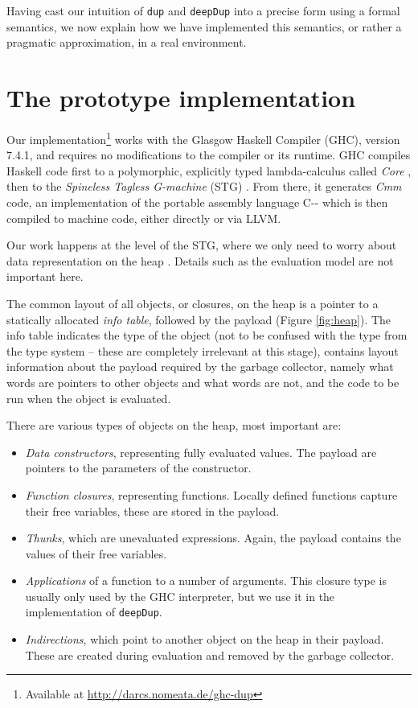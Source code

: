 \documentclass[preprint]{sigplanconf}
\theoremstyle{nonumberplain}
\newcommand{\li}{\lstinline[style=Haskell]}
\begin{document}
Having cast our intuition of \li-dup- and \li-deepDup- into a precise form using a formal semantics, we now explain how we have implemented this semantics, or rather a pragmatic approximation, in a real environment.

\section{The prototype implementation}
\label{sec:prototype}

Our implementation\footnote{Available at \url{http://darcs.nomeata.de/ghc-dup}} works with the Glasgow Haskell Compiler (GHC), version 7.4.1, and requires no modifications to the compiler or its runtime. GHC compiles Haskell code first to a polymorphic, explicitly typed lambda-calculus called \emph{Core} \citep{core,system-fc}, then to the \emph{Spineless Tagless G-machine} (STG) \citep{stg}. From there, it generates \emph{Cmm} code, an implementation of the portable assembly language C-{}- which is then compiled to machine code, either directly or via LLVM.

Our work happens at the level of the STG, where we only need to worry about data representation on the heap \citep{stg}. Details such as the evaluation model \cite{evalapply} are not important here.

The common layout of all objects, or closures,  on the heap is a pointer to a statically allocated \emph{info table}, followed by the payload (Figure \ref{fig:heap}). The info table indicates the type of the object (not to be confused with the type from the type system – these are completely irrelevant at this stage), contains layout information about the payload required by the garbage collector, namely what words are pointers to other objects and what words are not, and the code to be run when the object is evaluated.

There are various types of objects on the heap, most important are:
\begin{itemize}
\item \emph{Data constructors}, representing fully evaluated values. The payload are pointers to the parameters of the constructor.
\item \emph{Function closures}, representing functions. Locally defined functions capture their free variables, these are stored in the payload.
\item \emph{Thunks}, which are unevaluated expressions. Again, the payload contains the values of their free variables.
\item \emph{Applications} of a function to a number of arguments. This closure type is usually only used by the GHC interpreter, but we use it in the implementation of \li-deepDup-.
\item \emph{Indirections}, which point to another object on the heap in their payload. These are created during evaluation and removed by the garbage collector.
\end{itemize}
\end{document}
